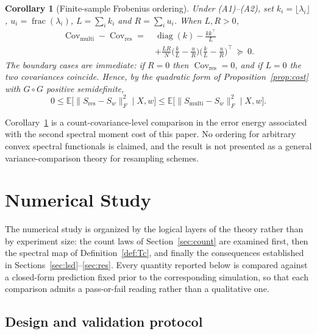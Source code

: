 \documentclass[lettersize,journal]{IEEEtran}
\newtheorem{coro}[theo]{Corollary}
\theoremstyle{remark}
\begin{document}
\begin{coro}[Finite-sample Frobenius ordering]
\label{coro:frob-order}
Under (A1)--(A2), set $k_i=\lfloor\lambda_i\rfloor$,
$u_i=\operatorname{frac}(\lambda_i)$, $L=\sum_ik_i$ and $R=\sum_iu_i$. When
$L,R>0$,
\begin{align}
  \operatorname{Cov}_{\mathrm{multi}}-\operatorname{Cov}_{\mathrm{res}}
    =\ &\operatorname{diag}(k)-\tfrac{kk^\top}{L}\nonumber\\
    &+\tfrac{LR}{N}\big(\tfrac kL-\tfrac uR\big)
      \big(\tfrac kL-\tfrac uR\big)^\top\ \succeq\ 0.
  \label{eq:frob-order}
\end{align}
The boundary cases are immediate: if $R=0$ then
$\operatorname{Cov}_{\mathrm{res}}=0$, and if $L=0$ the two covariances
coincide. Hence, by the quadratic form of Proposition~\ref{prop:cost} with
$G\circ G$ positive semidefinite,
\begin{equation}
  0\le\mathbb{E}\big[\|S_{\mathrm{res}}-S_w\|_F^2\mid X,w\big]
    \le\mathbb{E}\big[\|S_{\mathrm{multi}}-S_w\|_F^2\mid X,w\big].
  \label{eq:frob-ineq}
\end{equation}
\end{coro}

Corollary~\ref{coro:frob-order} is a count-covariance-level comparison in the
error energy associated with the second spectral moment cost of this paper. No
ordering for arbitrary convex spectral functionals is claimed, and the result
is not presented as a general variance-comparison theory for resampling
schemes.

\section{Numerical Study}
\label{sec:numerics}

The numerical study is organized by the logical layers of the theory rather
than by experiment size: the count laws of Section~\ref{sec:count} are
examined first, then the spectral map of Definition~\ref{def:Tc}, and finally
the consequences established in Sections~\ref{sec:lsd}--\ref{sec:res}. Every
quantity reported below is compared against a closed-form prediction fixed
prior to the corresponding simulation, so that each comparison admits a
pass-or-fail reading rather than a qualitative one.

\subsection{Design and validation protocol}
\label{sec:ix-design}
\end{document}
